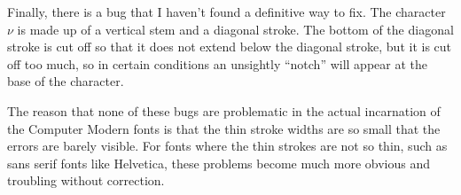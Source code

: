 Finally, there is a bug that I haven't found a definitive way to fix. The
character $\nu$ is made up of a vertical stem and a diagonal stroke. The bottom
of the diagonal stroke is cut off so that it does not extend below the diagonal
stroke, but it is cut off too much, so in certain conditions an unsightly
``notch'' will appear at the base of the character.

The reason that none of these bugs are problematic in the actual incarnation of
the Computer Modern fonts is that the thin stroke widths are so small that the
errors are barely visible. For fonts where the thin strokes are not so thin,
such as sans serif fonts like Helvetica, these problems become much more obvious
and troubling without correction.
